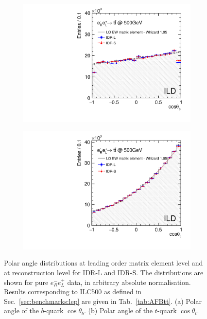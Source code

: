 \begin{figure}[htbp]
\begin{subfigure}{0.475\hsize} 
\includegraphics[width=\textwidth]{Performance/fig/compare_normalized_eRpL_b}
 \caption{ \label{fig:ttbar:costhetabRL}}
 \end{subfigure}
\begin{subfigure}{0.475\hsize} 
\includegraphics[width=\textwidth]{Performance/fig/compare_normalized_eRpL}
 \caption{  \label{fig:ttbar:costhetatRL}}
 \end{subfigure}
\caption{Polar angle distributions at leading order matrix element level and at reconstruction level for IDR-L and IDR-S. The distributions are shown for pure $e^-_R e^+_L$ data, in arbitrary absolute normalisation. Results corresponding to ILC500 as defined in  Sec.~\ref{sec:benchmarks:lep} are given in Tab.~\ref{tab:AFBtt}.
(a) Polar angle of the $b$-quark $\cos{\theta_b}$. 
(b) Polar angle of the $t$-quark $\cos{\theta_t}$.
}
\label{fig:ttbar:resultRL}
\end{figure}

